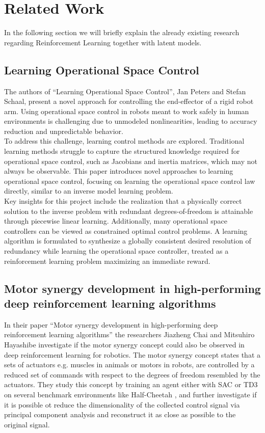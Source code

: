 \chapter{Related Work}\label{chap:relatedwork}

In the following section we will briefly explain the already existing research regarding Reinforcement Learning together with latent models.

\section{Learning Operational Space Control}

The authors of ``Learning Operational Space Control''\cite{Learning_to_Control_in_Operational_Space}, Jan Peters and Stefan Schaal, present a novel approach for controlling the end-effector of a rigid robot arm. Using operational space control in robots meant to work safely in human environments is challenging due to unmodeled nonlinearities, leading to accuracy reduction and unpredictable behavior.\\
To address this challenge, learning control methods are explored. Traditional learning methods struggle to capture the structured knowledge required for operational space control, such as Jacobians and inertia matrices, which may not always be observable. This paper introduces novel approaches to learning operational space control, focusing on learning the operational space control law directly, similar to an inverse model learning problem. \\
Key insights for this project include the realization that a physically correct solution to the inverse problem with redundant degrees-of-freedom is attainable through piecewise linear learning. Additionally, many operational space controllers can be viewed as constrained optimal control problems. A learning algorithm is formulated to synthesize a globally consistent desired resolution of redundancy while learning the operational space controller, treated as a reinforcement learning problem maximizing an immediate reward.

\section{Motor synergy development in high-performing deep reinforcement learning algorithms}

In their paper ``Motor synergy development in high-performing deep reinforcement learning algorithms''\cite{Motor_Synergy_Learning} the researchers Jiazheng Chai and  Mitsuhiro Hayashibe investigate if the motor synergy concept could also be observed in deep reinforcement learning for robotics. The motor synergy concept states that a sets of actuators e.g. muscles in animals or motors in robots, are controlled by a reduced set of commands with respect to the degrees of freedom resembled by the actuators. They study this concept by training an agent either with SAC or TD3 on several benchmark environments like Half-Cheetah \cite{Half_Cheetah}, and further investigate if it is possible ot reduce the dimensionality of the collected control signal via principal component analysis \cite{PCA} and reconstruct it as close as possible to the original signal.


